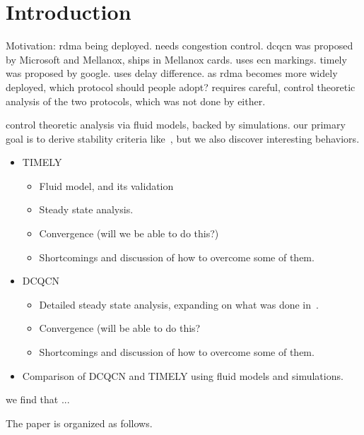 \section{Introduction}


Motivation: rdma being deployed. needs congestion control. dcqcn was proposed by Microsoft and Mellanox,
ships in Mellanox cards. uses ecn markings. timely was proposed by google. uses
delay difference. as rdma becomes more widely deployed, which protocol should
people adopt? requires careful, control theoretic analysis of the two
protocols, which was not done
by either. 


control theoretic analysis via fluid models, backed by simulations.
our primary goal is to derive stability criteria
like~\cite{dctcp-analysis}, but we also discover interesting behaviors. 



\begin{itemize}

\item TIMELY
\begin{itemize}
\item Fluid model, and its validation
\item Steady state analysis.
\item Convergence (will we be able to do this?)
\item Shortcomings and discussion of how to overcome some of them.
\end{itemize}

\item DCQCN
\begin{itemize}
\item
Detailed steady state analysis, expanding on what was done in~\cite{xx}. 
\item Convergence (will be able to do this?
\item Shortcomings and discussion of how to overcome some of them.
\end{itemize}

\item Comparison of DCQCN and TIMELY using fluid models and simulations. 

\end{itemize}

we find that ...


The paper is organized as follows.  


